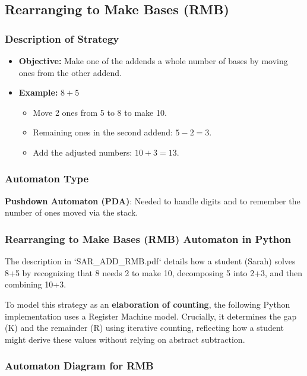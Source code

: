\documentclass[11pt]{article}
\begin{document}
\subsection*{Rearranging to Make Bases (RMB)}

\subsubsection*{Description of Strategy}
\begin{itemize}
    \item \textbf{Objective:} Make one of the addends a whole number of bases by moving ones from the other addend.
    \item \textbf{Example:} \(8 + 5\)
    \begin{itemize}
        \item Move 2 ones from 5 to 8 to make 10.
        \item Remaining ones in the second addend: \(5 - 2 = 3\).
        \item Add the adjusted numbers: \(10 + 3 = 13\).
    \end{itemize}
\end{itemize}

\subsubsection*{Automaton Type}
\textbf{Pushdown Automaton (PDA)}: Needed to handle digits and to remember the number of ones moved via the stack.

\subsubsection*{Rearranging to Make Bases (RMB) Automaton in Python}

The description in `SAR_ADD_RMB.pdf` details how a student (Sarah) solves 8+5 by recognizing that 8 needs 2 to make 10, decomposing 5 into 2+3, and then combining 10+3.

To model this strategy as an \textbf{elaboration of counting}, the following Python implementation uses a Register Machine model. Crucially, it determines the gap (K) and the remainder (R) using iterative counting, reflecting how a student might derive these values without relying on abstract subtraction.

\subsubsection*{Automaton Diagram for RMB}
\end{document}
